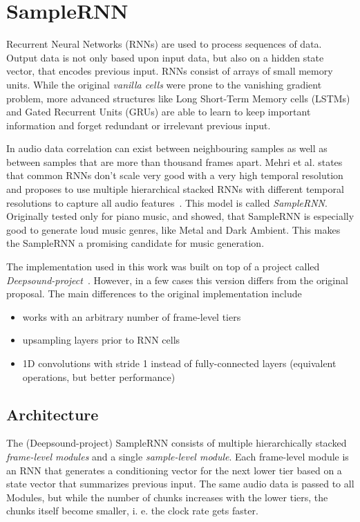 \documentclass[12pt]{article}
\begin{document}
\section{SampleRNN}
Recurrent Neural Networks (RNNs) are used to process sequences of data.
Output data is not only based upon input data, but also on a hidden state vector, that encodes previous input.
RNNs consist of arrays of small memory units.
While the original \emph{vanilla cells} were prone to the vanishing gradient problem, more advanced structures like Long Short-Term Memory cells (LSTMs) and Gated Recurrent Units (GRUs) are able to learn to keep important information and forget redundant or irrelevant previous input.

In audio data correlation can exist between neighbouring samples as well as between samples that are more than thousand frames apart.
Mehri et al. states that common RNNs don't scale very good with a very high temporal resolution and proposes to use multiple hierarchical stacked RNNs with different temporal resolutions to capture all audio features~\cite{mehri2016samplernn}.
This model is called \emph{SampleRNN}.
Originally tested only for piano music, \cite{zukowski2018generating} and \cite{carr2018generating} showed, that SampleRNN is especially good to generate loud music genres, like Metal and Dark Ambient.
This makes the SampleRNN a promising candidate for music generation.

The implementation used in this work was built on top of a project called \emph{Deepsound-project}~\cite{samplernn-git}.
However, in a few cases this version differs from the original proposal.
The main differences to the original implementation include
\begin{itemize}
 \item works with an arbitrary number of frame-level tiers
 \item upsampling layers prior to RNN cells
 \item 1D convolutions with stride 1 instead of fully-connected layers (equivalent operations, but better performance)
\end{itemize}



\subsection{Architecture}
The (Deepsound-project) SampleRNN consists of multiple hierarchically stacked \emph{frame-level modules} and a single \emph{sample-level module}.
Each frame-level module is an RNN that generates a conditioning vector for the next lower tier based on a state vector that summarizes previous input.
The same audio data is passed to all Modules, but while the number of chunks increases with the lower tiers, the chunks itself become smaller, i. e. the clock rate gets faster.
\end{document}
